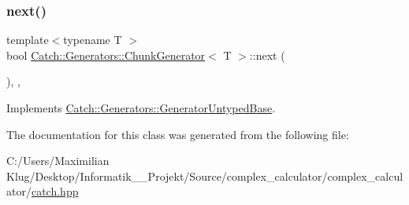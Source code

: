 \mbox{\label{class_catch_1_1_generators_1_1_chunk_generator_a545e89f80eb1e3c953491541ea083f86}} 
\subsubsection{\texorpdfstring{next()}{next()}}
{\footnotesize\ttfamily template$<$typename T $>$ \\
bool \mbox{\hyperlink{class_catch_1_1_generators_1_1_chunk_generator}{Catch\+::\+Generators\+::\+Chunk\+Generator}}$<$ T $>$\+::next (\begin{DoxyParamCaption}{ }\end{DoxyParamCaption})\hspace{0.3cm}{\ttfamily [inline]}, {\ttfamily [override]}, {\ttfamily [virtual]}}



Implements \mbox{\hyperlink{class_catch_1_1_generators_1_1_generator_untyped_base_aeed3c0cd6233c5f553549e453b8d6638}{Catch\+::\+Generators\+::\+Generator\+Untyped\+Base}}.



The documentation for this class was generated from the following file\+:\begin{DoxyCompactItemize}
\item 
C\+:/\+Users/\+Maximilian Klug/\+Desktop/\+Informatik\+\_\+\_\+\+Projekt/\+Source/complex\+\_\+calculator/complex\+\_\+calculator/\mbox{\hyperlink{catch_8hpp}{catch.\+hpp}}\end{DoxyCompactItemize}
